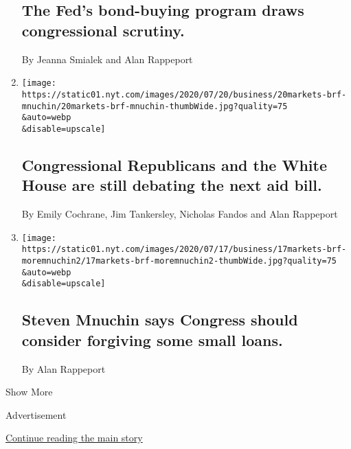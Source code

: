 \begin{enumerate}
{  \subsection{The Fed's bond-buying program draws congressional
  scrutiny.}\label{the-feds-bond-buying-program-draws-congressional-scrutiny}}

  By Jeanna Smialek and Alan Rappeport
\item
  \href{/live/2020/07/20/business/stock-market-today-coronavirus/congressional-republicans-and-the-white-house-are-still-debating-the-next-aid-bill}{}

  \texttt{[image: https://static01.nyt.com/images/2020/07/20/business/20markets-brf-mnuchin/20markets-brf-mnuchin-thumbWide.jpg?quality=75\\\&auto=webp\\\&disable=upscale]}

  \hypertarget{congressional-republicans-and-the-white-house-are-still-debating-the-next-aid-bill}{%
  \subsection{Congressional Republicans and the White House are still
  debating the next aid
  bill.}\label{congressional-republicans-and-the-white-house-are-still-debating-the-next-aid-bill}}

  By Emily Cochrane, Jim Tankersley, Nicholas Fandos and Alan Rappeport
\item
  \href{/live/2020/07/17/business/stock-market-today-coronavirus/steven-mnuchin-says-congress-should-consider-forgiving-some-small-loans}{}

  \texttt{[image: https://static01.nyt.com/images/2020/07/17/business/17markets-brf-moremnuchin2/17markets-brf-moremnuchin2-thumbWide.jpg?quality=75\\\&auto=webp\\\&disable=upscale]}

  \hypertarget{steven-mnuchin-says-congress-should-consider-forgiving-some-small-loans}{%
  \subsection{Steven Mnuchin says Congress should consider forgiving
  some small
  loans.}\label{steven-mnuchin-says-congress-should-consider-forgiving-some-small-loans}}

  By Alan Rappeport
\end{enumerate}

Show More

Advertisement

\protect\hyperlink{after-mid2}{Continue reading the main story}


